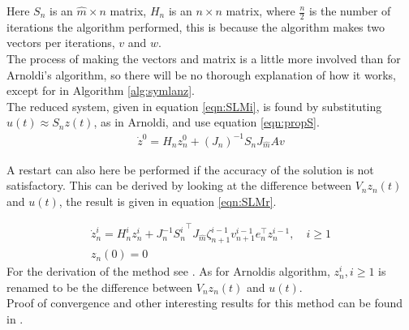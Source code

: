 Here $S_n$ is an $\hat{m} \times n $ matrix, $H_n$ is an $ n \times n $ matrix, where $\frac{n}{2}$ is the number of iterations the algorithm performed, this is because the algorithm makes two vectors per iterations, $v$ and $w$. \\

The process of making the vectors and matrix is a little more involved than for Arnoldi's algorithm, so there will be no thorough explanation of how it works, except for in Algorithm \ref{alg:symlanz}.\\

The reduced system, given in equation \ref{eqn:SLMi}, is found by substituting $u(t) \approx S_n z(t) $, as in Arnoldi, and use equation \eqref{eqn:propS}. 
\begin{equation}
\begin{aligned}
\dot{z}^0 = H_n z_n^0 + (J_n)^{-1} S_n J_{\hat{m}} A v
\end{aligned}
\label{eqn:SLMi}
\end{equation}

A restart can also here be performed if the accuracy of the solution is not satisfactory. This can be derived by looking at the difference between $V_n z_n(t)$ and $u(t)$, the result is given in equation \eqref{eqn:SLMr}. 

\begin{equation}
\begin{aligned}
\dot{z}_n^i = H_n^i z_n^i + J^{-1}_n {S_n^i}^\top J_{\hat{m}} \zeta_{n+1}^{i-1}v_{n+1}^{i-1} e_n^\top z_n^{i-1}, \quad  i \geq 1 \\
z_n(0) = 0
\end{aligned}
\label{eqn:SLMr}
\end{equation}
For the derivation of the method see \cite{!!!!!!!!!}. As for Arnoldis algorithm, $z_n^i, i \geq 1 $ is renamed to be the difference between $V_n z_n(t)$ and $u(t)$.\\

Proof of convergence and other interesting results for this method can be found in \citep{!!!!!!!!!!!}. 


